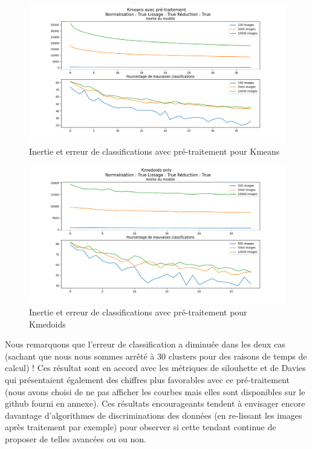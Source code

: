 \documentclass{article}
\begin{document}
\begin{figure}[H]
    \centering
    \includegraphics[width=\textwidth]{"./Images/Kmeans_prepro_err.png"}
    \caption{Inertie et erreur de classifications avec pré-traitement pour Kmeans}
\end{figure}

\begin{figure}[H]
    \centering
    \includegraphics[width=\textwidth]{"./Images/Kmedoids_pre_pro_err.png"}
    \caption{Inertie et erreur de classifications avec pré-traitement pour Kmedoids}
    \label{fig:kmedoidspapapa}
\end{figure}
\vspace{2mm}

Nous remarquons que l'erreur de classification a diminuée dans  les deux cas (sachant que nous nous sommes arrêté à 30 clusters pour des raisons de temps de calcul) ! Ces résultat sont en accord avec les métriques de silouhette et de Davies qui présentaient également des chiffres plus favorables avec ce pré-traitement (nous avons choisi de ne pas afficher les courbes mais elles sont disponibles sur le github fourni en annexe).
Ces résultats encourageants tendent à envisager encore davantage d'algorithmes de discriminations des données (en re-lissant les images après traitement par exemple) pour observer si cette tendant continue de proposer de telles avancées ou ou non.
\end{document}
